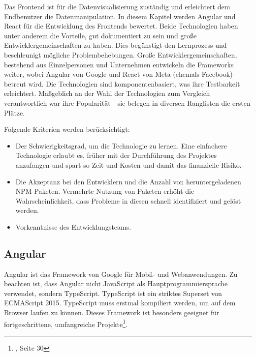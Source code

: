 Das Frontend ist für die Datenvisualisierung zuständig und erleichtert dem Endbenutzer die Datenmanipulation. In diesem Kapitel werden Angular und React für die Entwicklung des Frontends bewertet. Beide Technologien haben unter anderem die Vorteile, gut dokumentiert zu sein und große Entwicklergemeinschaften zu haben\cite{SO01}. Dies begünstigt den Lernprozess und beschleunigt mögliche Problembehebungen. Große Entwicklergemeinschaften, bestehend aus Einzelpersonen und Unternehmen entwickeln die Frameworks weiter, wobei Angular von Google und React von Meta (ehemals Facebook) betreut wird. Die Technologien sind komponentenbasiert, was ihre Testbarkeit erleichtert. Maßgeblich an der Wahl der Technologien zum Vergleich verantwortlich war ihre Popularität - sie belegen in diversen Ranglisten die ersten Plätze.\cite{SO01}

Folgende Kriterien werden berücksichtigt:
\begin{itemize}
  \item
        Der Schwierigkeitsgrad, um die Technologie zu lernen. Eine einfachere Technologie erlaubt es, früher mit der Durchführung des Projektes anzufangen und spart so Zeit und Kosten und damit das finanzielle Risiko.
  \item
        Die Akzeptanz bei den Entwicklern und die Anzahl von heruntergeladenen NPM-Paketen. Vermehrte Nutzung von Paketen erhöht die Wahrscheinlichkeit, dass Probleme in diesen schnell identifiziert und gelöst werden.\cite{LIN1}
  \item
        Vorkenntnisse des Entwicklungsteams.

\end{itemize}

\subsection*{Angular}
Angular ist das Framework von Google für Mobil- und Webanwendungen.
Zu beachten ist, dass Angular nicht JavaScript als Hauptprogrammiersprache verwendet, sondern TypeScript.
TypeScript ist ein striktes Superset von ECMAScript 2015.
TypeScript muss erstmal kompiliert werden, um auf dem Browser laufen zu können{\cite{MS1}}. Dieses Framework ist besonders geeignet für fortgeschrittene, umfangreiche Projekte\footnote{{\cite{AN1}}, Seite 30}.

